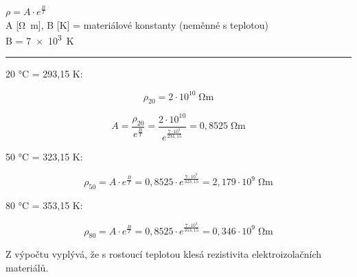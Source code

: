 
$\rho = A \cdot e^\frac{B}{T}$\\
A [\si{\ohm\meter}], B [\si{\kelvin}] = materiálové konstanty (neměnné s teplotou)\\
B = \SI{7e3}{\kelvin}\\
\noindent\rule{8cm}{0.4pt}

20 \si{\celsius} = 293,15 \si{\kelvin}:

\begin{equation*}
    \rho_{20} = 2 \cdot 10^{10} \; \si{\ohm\meter}
\end{equation*}

\begin{equation*}
    A = \frac{\rho_{20}}{e^\frac{B}{T}} = \frac{2 \cdot 10^{10}}{e^\frac{7 \cdot 10^3}{293,15}} = 0,8525 \; \si{\ohm\meter}
\end{equation*}

50 \si{\celsius} = 323,15 \si{\kelvin}:

\begin{equation*}
    \rho_{50} = A \cdot e^\frac{B}{T} = 0,8525 \cdot e^\frac{7 \cdot 10^3}{323,15} = 2,179 \cdot 10^9 \; \si{\ohm\meter}
\end{equation*}

80 \si{\celsius} = 353,15 \si{\kelvin}:

\begin{equation*}
    \rho_{80} = A \cdot e^\frac{B}{T} = 0,8525 \cdot e^\frac{7 \cdot 10^3}{353,15} = 0,346 \cdot 10^9 \; \si{\ohm\meter}
\end{equation*}

Z výpočtu vyplývá, že s rostoucí teplotou klesá rezistivita elektroizolačních materiálů.

\newpage


